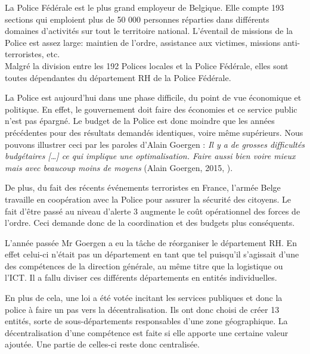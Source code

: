 La Police Fédérale est le plus grand employeur de Belgique. Elle compte 193 sections qui emploient plus de 50 000 personnes réparties dans différents domaines d'activités sur tout le territoire national. L'éventail de missions de la Police est assez large: maintien de l'ordre, assistance aux victimes, missions anti-terroristes, etc.\\
Malgré la division entre les 192 Polices locales et la Police Fédérale, elles sont toutes dépendantes du département RH de la Police Fédérale.\newline
 
La Police est aujourd'hui dans une phase difficile, du point de vue économique et politique. En effet, le gouvernement doit faire des économies et ce service public n'est pas épargné. Le budget de la Police est donc moindre que les années précédentes %
 pour des résultats demandés identiques, voire même supérieurs. Nous pouvons illustrer ceci par les paroles d'Alain Goergen : \textit{\og Il y a de grosses difficultés budgétaires [\ldots] ce qui implique une optimalisation. Faire aussi bien voire mieux mais avec beaucoup moins de moyens \fg{}} (Alain Goergen, 2015, \cite{tableronde}). \newline

De plus, du fait des récents événements terroristes en France, l'armée Belge travaille en coopération avec la Police pour assurer la sécurité des citoyens. Le fait d'être passé au niveau d'alerte 3 augmente le coût opérationnel des forces de l'ordre. Ceci demande donc de la coordination et des budgets plus conséquents. \newline

L'année passée Mr Goergen a eu la tâche de réorganiser le département RH. En effet celui-ci n'était pas un département en tant que tel puisqu'il s'agissait d'une des compétences de la direction générale, au même titre que la logistique ou l'ICT. Il a fallu diviser ces différents départements en entités individuelles.\newline

En plus de cela, une loi a été votée incitant les services publiques et donc la police à faire un pas vers la décentralisation. Ils ont donc choisi de créer 13 entités, sorte de sous-départements responsables d'une zone géographique. La décentralisation d'une compétence est faite si elle apporte une certaine valeur ajoutée. Une partie de celles-ci reste donc centralisée.\newline

